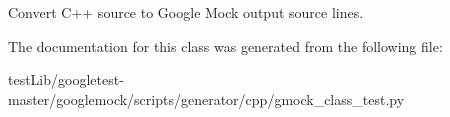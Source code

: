 \begin{DoxyVerb}Convert C++ source to Google Mock output source lines.\end{DoxyVerb}
 

The documentation for this class was generated from the following file\+:\begin{DoxyCompactItemize}
\item 
test\+Lib/googletest-\/master/googlemock/scripts/generator/cpp/gmock\+\_\+class\+\_\+test.\+py\end{DoxyCompactItemize}
